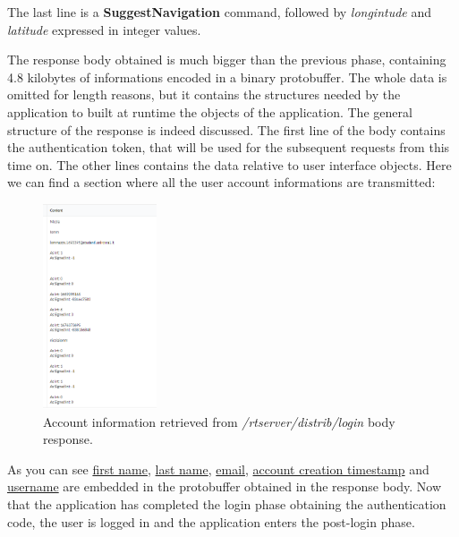 			The last line is a \textbf{SuggestNavigation} command, followed by \textit{longintude} and \textit{latitude} expressed in integer values.\newline
			\par The response body obtained is much bigger than the previous phase, containing 4.8 kilobytes of informations encoded in a binary protobuffer. The whole data is omitted for length reasons, but it contains the structures needed by the application to built at runtime the objects of the application. The general structure of the response is indeed discussed.\newline
			The first line of the body contains the authentication token, that will be used for the subsequent requests from this time on. \newline
			The other lines contains the data relative to user interface objects. Here we can find a section where all the user account informations are transmitted:
			\begin{figure}[H]
				\centering
				\includegraphics[width=0.3\textwidth]{images/waze_loginaccountinfo.png}
				\caption{Account information retrieved from \textit{/rtserver/distrib/login} body response.}
			\end{figure}
			As you can see \underline{first name}, \underline{last name}, \underline{email}, \underline{account creation timestamp} and \underline{username} are embedded in the protobuffer obtained in the response body. \newline
			Now that the application has completed the login phase obtaining the authentication code, the user is logged in and the application enters the post-login phase.			
			
